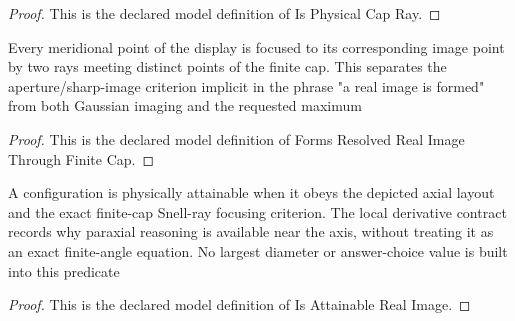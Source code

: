 \begin{proof}
  This is the declared model definition of Is Physical Cap Ray.
\end{proof}
\begin{definition}
  \label{def:physics:phyx-mini-0110:phyxminiproblems-problemphyxmini0110-formsresolvedrealimagethroughfinitecap}
  Every meridional point of the display is focused to its corresponding image point by two rays meeting distinct points of the finite cap. This separates the aperture/sharp-image criterion implicit in the phrase "a real image is formed" from both Gaussian imaging and the requested maximum
\end{definition}
\begin{proof}
  This is the declared model definition of Forms Resolved Real Image Through Finite Cap.
\end{proof}
\begin{definition}
  \label{def:physics:phyx-mini-0110:phyxminiproblems-problemphyxmini0110-isattainablerealimage}
  A configuration is physically attainable when it obeys the depicted axial layout and the exact finite-cap Snell-ray focusing criterion. The local derivative contract records why paraxial reasoning is available near the axis, without treating it as an exact finite-angle equation. No largest diameter or answer-choice value is built into this predicate
\end{definition}
\begin{proof}
  This is the declared model definition of Is Attainable Real Image.
\end{proof}
